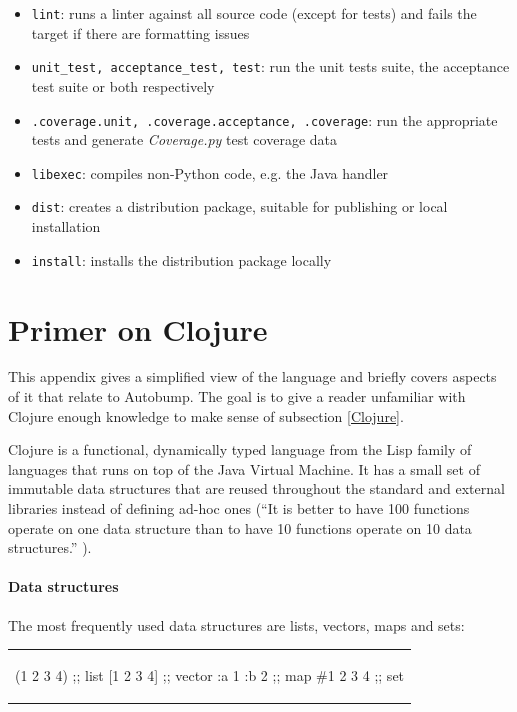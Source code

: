 \documentclass{l4proj}
\newcommand\genericstyle{\lstset{basicstyle=\ttm}}
\newcommand\codeinline[1]{{\genericstyle\lstinline!#1!}}
\begin{document}
\begin{appendices}
\begin{itemize}
\item \codeinline{lint}: runs a linter against all source code (except
for tests) and fails the target if there are formatting issues
\item \codeinline{unit_test, acceptance_test, test}: run the unit
tests suite, the acceptance test suite or both respectively
\item \codeinline{.coverage.unit, .coverage.acceptance, .coverage}:
run the appropriate tests and generate \textit{Coverage.py}
\cite{Coverage} test coverage data
\item \codeinline{libexec}: compiles non-Python code, e.g. the Java handler
\item \codeinline{dist}: creates a distribution package, suitable for
publishing or local installation
\item \codeinline{install}: installs the distribution package locally
\end{itemize}

\chapter{Primer on Clojure}
\label{ClojurePrimer}

This appendix gives a simplified view of the language and briefly
covers aspects of it that relate to Autobump. The goal is to give a
reader unfamiliar with Clojure enough knowledge to make sense of
subsection \ref{Clojure}.

Clojure is a functional, dynamically typed language from the Lisp
family of languages that runs on top of the Java Virtual Machine. It
has a small set of immutable data structures that are reused
throughout the standard and external libraries instead of defining
ad-hoc ones (``It is better to have 100 functions operate on one data
structure than to have 10 functions operate on 10 data
structures.'' \cite{ClojureRationale}).

\subsubsection{Data structures}

The most frequently used data structures are lists, vectors, maps and
sets:

\begin{center}
\begin{tabular}{c}
\begin{clojure}
(1 2 3 4)    ;; list
[1 2 3 4]    ;; vector
{:a 1 :b 2}  ;; map
#{1 2 3 4}   ;; set
\end{clojure}
\end{tabular}
\end{center}


\end{appendices}
\end{document}
